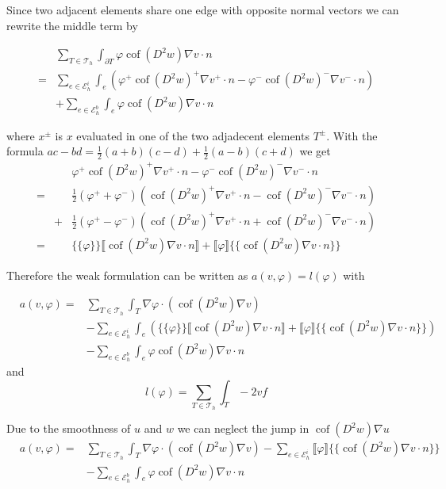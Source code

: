 \documentclass[a4paper,11pt]{article}
\newcommand{\myint}{\displaystyle\int}
\newcommand{\cof}{\operatorname{cof}}
\newcommand{\edgesi}{\mathcal{E}_h^i}
\newcommand{\edgesb}{\mathcal{E}_h^b}
\newcommand{\triang}{\mathcal{T}_h}
\begin{document}
Since two adjacent elements share one edge with opposite normal vectors we can rewrite the middle term by

\begin{eqnarray*}
&\sum\limits_{T \in \triang}\myint_{\partial T} \varphi \cof(D^2 w) \nabla v \cdot n \\
= &\sum\limits_{e \in \edgesi}\myint_{e} \left( \varphi^+ \cof(D^2 w)^+ \nabla v^+ \cdot n - \varphi^- \cof(D^2 w)^- \nabla v^- \cdot n \right) \\
& + \sum\limits_{e \in \edgesb}\myint_{e} \varphi \cof(D^2 w) \nabla v \cdot n
\end{eqnarray*}

where $x^\pm $ is $x$ evaluated in one of the two adjadecent elements $T^\pm$. With the formula $ac-bd = \frac 1 2 (a+b)(c-d) + \frac 1 2 (a-b)(c+d)$ we get
\begin{eqnarray*}
	&&\varphi^+ \cof(D^2 w)^+ \nabla v^+ \cdot n - \varphi^- \cof(D^2 w)^- \nabla v^- \cdot n \\
	= && \frac 1 2 \left(\varphi^+ + \varphi^- \right) \left(\cof(D^2 w)^+ \nabla v^+ \cdot n - \cof(D^2 w)^- \nabla v^- \cdot n \right) \\
  &+ & \frac 1 2 \left(\varphi^+ - \varphi^- \right) \left(\cof(D^2 w)^+ \nabla v^+ \cdot n + \cof(D^2 w)^- \nabla v^- \cdot n \right) \\
  = &&  \{\{\varphi\}\} \llbracket \cof(D^2 w) \nabla v \cdot n \rrbracket + \llbracket\varphi\rrbracket \{\{ \cof(D^2 w) \nabla v \cdot n \}\}
\end{eqnarray*}

Therefore the weak formulation can be written as $a(v,\varphi) = l(\varphi)$ with 

\begin{eqnarray*}
 &a(v, \varphi) = & \sum\limits_{T \in \triang} \myint_T \nabla \varphi \cdot \left(\cof(D^2 w) \nabla v\right) \\
	& &- \sum\limits_{e \in \edgesi}\myint_{e} \left( \{\{\varphi\}\} \llbracket \cof(D^2 w) \nabla v \cdot n \rrbracket + \llbracket\varphi\rrbracket \{\{ \cof(D^2 w) \nabla v \cdot n \}\} \right)\\
&& - \sum\limits_{e \in \edgesb}\myint_{e} \varphi \cof(D^2 w) \nabla v \cdot n
\end{eqnarray*}
and
\[
l(\varphi) = \sum_{T \in \triang} \int_T -2v f
\]

Due to the smoothness of $u$ and $w$ we can neglect the jump in $\cof(D^2 w) \nabla u$
\begin{eqnarray*}
 &a(v, \varphi) = & \sum\limits_{T \in \triang} \myint_T \nabla \varphi \cdot \left(\cof(D^2 w) \nabla v\right) %
	- \sum\limits_{e \in \edgesi}
	\llbracket\varphi\rrbracket \{\{ \cof(D^2 w) \nabla v \cdot n \}\} %
	\\
&& - \sum\limits_{e \in \edgesb}\myint_{e} \varphi \cof(D^2 w) \nabla v \cdot n
\end{eqnarray*}
\end{document}
